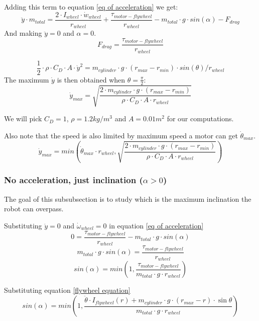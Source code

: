 \begin{enumerate}
    Adding this term to equation \ref{eq of acceleration} we get:
    \[  \ddot{y}\cdot m_{total} = \frac{2\cdot I_{wheel} \cdot  \dot{w}_{wheel}}{r_{wheel}} + \frac{\tau_{motor-flywheel}}{r_{wheel}} - m_{total} \cdot  g \cdot  sin(\alpha) - F_{drag} \]
    And making $\ddot{y} = 0$ and $\alpha = 0$.
    \[  F_{drag} = \frac{\tau_{motor-flywheel}}{r_{wheel}}\]

    \[\frac{1}{2}\cdot \rho\cdot C_D \cdot  A \cdot  \dot{y}^2 = m_{cylinder} \cdot  g \cdot  (r_{max} - r_{min})\cdot sin(\theta) / r_{wheel} \]
    The maximum $\dot{y}$ is then obtained when $\theta=\frac{\pi}{2}$:
    \begin{equation*}
        \dot{y}_{max} = \sqrt{\frac{2\cdot m_{cylinder} \cdot  g \cdot  (r_{max} - r_{min})}{\rho\cdot C_D \cdot  A \cdot  r_{wheel}} }
    \end{equation*}

    We will pick $C_D=1$, $\rho=1.2 kg/m^3$ and $A=0.01 m^2$ for our computations.

    Also note that the speed is also limited by maximum speed a motor can get
    $\dot{\theta}_{max}$.
    \begin{equation}
        \boxed{\dot{y}_{max} = min(\dot{\theta}_{max}\cdot r_{wheel}, \sqrt{\frac{2\cdot m_{cylinder} \cdot  g \cdot  (r_{max} - r_{min})}{\rho\cdot C_D \cdot  A \cdot  r_{wheel}} })}
        \label{maximum speed pendulum}
    \end{equation}


\end{enumerate}
\subsubsection{No acceleration, just inclination ($\alpha > 0$)}
The goal of this subsubsection is to study which is the maximum inclination the robot can overpass.

Substituting $\ddot{y}=0$ and $\dot{\omega}_{wheel} = 0$ in equation \ref{eq of acceleration}
\[0 = \frac{\tau_{motor-flywheel}}{r_{wheel}} - m_{total} \cdot  g \cdot  sin(\alpha)\]
\[m_{total} \cdot  g \cdot  sin(\alpha) = \frac{\tau_{motor-flywheel}}{r_{wheel}} \]
\[sin(\alpha) = min(1,\frac{\tau_{motor-flywheel}}{m_{total} \cdot  g \cdot  r_{wheel}}) \]

Substituting equation \ref{flywheel equation}
\[sin(\alpha) = min(1,\frac{\ddot{\theta}\cdot I_{flywheel}(r) + m_{cylinder} \cdot  g \cdot  (r_{max} - r) \cdot  \sin{\theta}}{m_{total} \cdot  g \cdot  r_{wheel}}) \]


